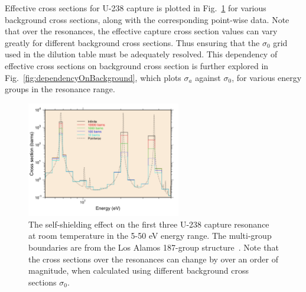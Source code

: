 \documentclass[10pt]{article}
\begin{document}
Effective cross sections for U-238 capture is plotted in Fig.~\ref{fig:njoyDil} for various background cross sections, along with the corresponding point-wise data. Note that over the resonances, the effective capture cross section values can vary greatly for different background cross sections. Thus ensuring that the $\sigma_0$ grid used in the dilution table must be adequately resolved. This dependency of effective cross sections on background cross section is further explored in Fig.~\ref{fig:dependencyOnBackground}, which plots $\sigma_a$ against $\sigma_0$, for various energy groups in the resonance range. 

\begin{figure}[H]
  \begin{center}
\includegraphics[width=0.6\textwidth]{njoyGroupr}
  \caption{The self-shielding effect on the first three U-238 capture resonance at room temperature in the 5-50 eV energy range. The multi-group boundaries are from the Los Alamos 187-group structure~\cite{njoy16}. Note that the cross sections over the resonances can change by over an order of magnitude, when calculated using different background cross sections $\sigma_0$.}
  \label{fig:njoyDil}
  \end{center}
\end{figure}
\end{document}
